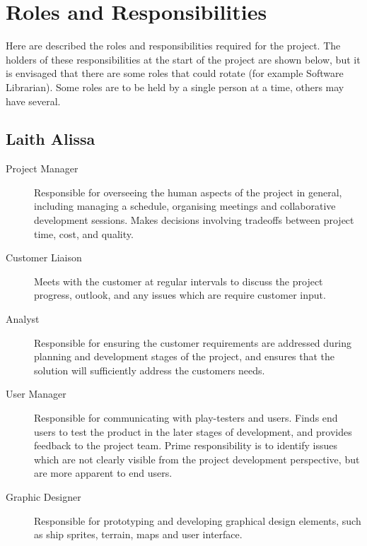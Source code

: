 \section{Roles and Responsibilities}
\label{section:roles}

Here are described the roles and responsibilities required for the project. The holders of these responsibilities at the start of the project are shown below, but it is envisaged that there are some roles that could rotate (for example Software Librarian). Some roles are to be held by a single person at a time, others may have several.

\subsection{Laith Alissa}
\begin{description}

    \item[Project Manager] Responsible for overseeing the human aspects of the project in general, including managing a schedule, organising meetings and collaborative development sessions. Makes decisions involving tradeoffs between project time, cost, and quality.
    
    \item[Customer Liaison] Meets with the customer at regular intervals to discuss the project progress, outlook, and any issues which are require customer input. 
 
    \item[Analyst] Responsible for ensuring the customer requirements are addressed during planning and development stages of the project, and ensures that the solution will sufficiently address the customers needs.
     
    \item[User Manager] Responsible for communicating with play-testers and users. Finds end users to test the product in the later stages of development, and provides feedback to the project team. Prime responsibility is to identify issues which are not clearly visible from the project development perspective, but are more apparent to end users. 

	\item[Graphic Designer] Responsible for prototyping and developing graphical design elements, such as ship sprites, terrain, maps and user interface.   
	 
\end{description}

